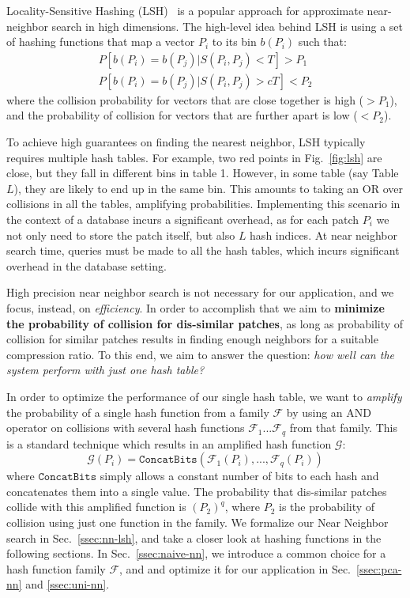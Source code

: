 Locality-Sensitive Hashing (LSH)~\cite{LSH:Andoni}
is a popular approach for approximate near-neighbor search
in high dimensions. The high-level idea behind LSH is
using a set of hashing functions that map
a vector $P_i$ to its bin $b(P_i)$ such that:
\begin{equation*}
\begin{aligned}
P[b(P_i) = b(P_j) | S(P_i, P_j) < T] > P_1\\
P[b(P_i) = b(P_j) | S(P_i, P_j) > cT] < P_2
\end{aligned}
\end{equation*}
where the collision probability
for vectors that are close together is high
($> P_1$), and the probability of collision
for vectors that are further apart is low ($< P_2$).

To achieve high guarantees on finding the nearest
neighbor, LSH typically requires multiple hash tables.
For example, two red points in Fig.~\ref{fig:lsh} are close,
but they fall in different bins in table 1. However,
in some table (say Table $L$), they are likely to end up in
the same bin. This amounts to taking an OR over
collisions in all the tables, amplifying probabilities.
Implementing this scenario in the context
of a database incurs a significant overhead, as for each
patch $P_i$ we not only need to store the patch itself,
but also $L$ hash indices. At near neighbor search time,
queries must be made to all the hash tables, which incurs significant
overhead in the database setting.

High precision near neighbor search is not necessary
for our application, and we focus, instead, on \emph{efficiency}.
In order to accomplish that we aim to \textbf{minimize the
probability of collision for dis-similar patches}, as long
as probability of collision for similar patches results in
finding enough neighbors for a suitable compression ratio.
To this end, we aim to answer the question:
\emph{how well can the system perform with just one hash table?}

In order to optimize the performance of our single hash table,
we want to \emph{amplify} the probability of a single hash
function from a family $\mathcal{F}$ by using an AND operator
on collisions with several hash functions
$\mathcal{F}_1...\mathcal{F}_q$ from that family.
This is a standard technique which results in an amplified
hash function $\mathcal{G}$:
\begin{equation}
\mathcal{G}(P_i) = \mathtt{ConcatBits}(\mathcal{F}_1(P_i),...,\mathcal{F}_q(P_i))
\end{equation}\label{eq:ampl}
where $\mathtt{ConcatBits}$ simply allows a constant
number of bits to each hash and concatenates them into a single value.
The probability that dis-similar patches collide with
this amplified function is $(P_2)^q$, where $P_2$ is the
probability of collision using just one function in the family.
We formalize our Near Neighbor search in Sec.~\ref{ssec:nn-lsh},
and take a closer look at hashing functions in the following sections.
In Sec.~\ref{ssec:naive-nn}, we introduce a common choice for a
 hash function family $\mathcal{F}$, and
and optimize it for our application in Sec.~\ref{ssec:pca-nn}
and \ref{ssec:uni-nn}.

